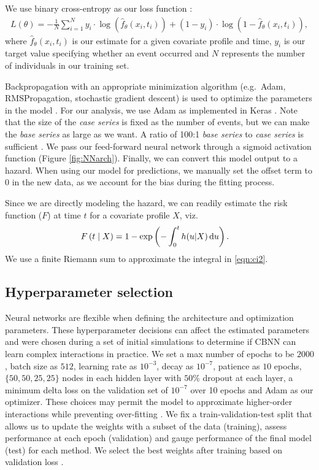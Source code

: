 \documentclass[APA,LATO1COL]{WileyNJD-v2}
\begin{document}
We use binary cross-entropy as our loss function \citep{gulli2017}:
\begin{align*}
L(\theta)=-\frac{1}{N} \sum^{N}_{i=1} y_{i} \cdot \log(\hat{f}_{\theta}(x_{i}, t_{i}) ) + (1-y_{i} )\cdot \log(1-\hat{f}_{\theta}(x_{i}, t_{i}) ),
\end{align*} where \(\hat{f}_{\theta}(x_{i}, t_{i})\) is our estimate
for a given covariate profile and time, \(y_{i}\) is our target value
specifying whether an event occurred and \(N\) represents the number of
individuals in our training set.

Backpropagation with an appropriate minimization algorithm (e.g.~Adam,
RMSPropagation, stochastic gradient descent) is used to optimize the
parameters in the model \citep{gulli2017}. For our analysis, we use Adam
as implemented in Keras \citep{gulli2017}. Note that the size of the
\emph{case series} is fixed as the number of events, but we can make the
\emph{base series} as large as we want. A ratio of 100:1 \emph{base
series} to \emph{case series} is sufficient \citep{hanley2009}. We pass
our feed-forward neural network through a sigmoid activation function
(Figure \ref{fig:NNarch}). Finally, we can convert this model output to
a hazard. When using our model for predictions, we manually set the
offset term to 0 in the new data, as we account for the bias during the
fitting process.

Since we are directly modeling the hazard, we can readily estimate the
risk function (\(F\)) at time \(t\) for a covariate profile \(X\),
viz.\begin{align}\label{eqn:ci2}
F\left(t\mid X\right)& = 1 - \exp\left(-\int_{0}^{t}h(u|X) \,\textrm du\right).
\end{align} We use a finite Riemann sum \citep{hughes2020calculus} to
approximate the integral in \eqref{eqn:ci2}.

\hypertarget{hyperparameter-selection}{%
\subsection{Hyperparameter selection}\label{hyperparameter-selection}}

Neural networks are flexible when defining the architecture and
optimization parameters. These hyperparameter decisions can affect the
estimated parameters and were chosen during a set of initial simulations
to determine if CBNN can learn complex interactions in practice. We set
a max number of epochs to be \(2000\), batch size as \(512\), learning
rate as \(10^{-3}\), decay as \(10^{-7}\), patience as \(10\) epochs,
\(\{50,50,25,25\}\) nodes in each hidden layer with \(50\%\) dropout at
each layer, a minimum delta loss on the validation set of \(10^{-7}\)
over 10 epochs and Adam \citep{gulli2017} as our optimizer. These
choices may permit the model to approximate higher-order interactions
while preventing over-fitting \citep{srivastava2014dropout}. We fix a
train-validation-test split that allows us to update the weights with a
subset of the data (training), assess performance at each epoch
(validation) and gauge performance of the final model (test) for each
method. We select the best weights after training based on validation
loss \citep{gulli2017}.
\end{document}
